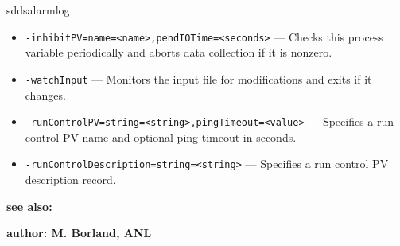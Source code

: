 \begin{sddsprog}{sddsalarmlog}
\begin{itemize}
      \item {\tt -inhibitPV=name=<name>,pendIOTime=<seconds>} --- Checks this process variable periodically and aborts data collection if it is nonzero.
      \item {\tt -watchInput} --- Monitors the input file for modifications and exits if it changes.
      \item {\tt -runControlPV=string=<string>,pingTimeout=<value>} --- Specifies a run control PV name and optional ping timeout in seconds.
      \item {\tt -runControlDescription=string=<string>} --- Specifies a run control PV description record.
    \end{itemize}

\item {\bf see also:}


\item {\bf author: M. Borland, ANL} 
\end{sddsprog}
